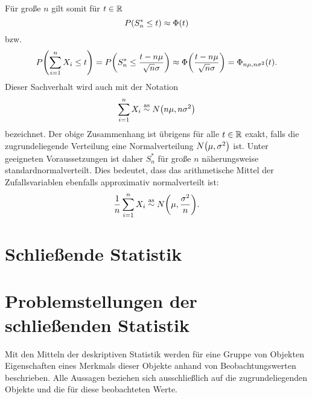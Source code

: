 \documentclass{lecture}
\begin{document}
    Für große \(n\) gilt somit für \(t \in \mathbb{R}\)
    \[
        P\parentheses*{S_n^* \le t} \approx \Phi\parentheses*{t}
    \]
    bzw.
    \[
        P\parentheses*{\sum_{i = 1}^n X_i \le t} = P\parentheses*{S_n^* \le \frac{t - n\mu}{\sqrt{n}\sigma}} \approx \Phi\parentheses*{\frac{t - n\mu}{\sqrt{n}\sigma}} = \Phi_{n\mu, n\sigma^2}\parentheses*{t}.
    \]
    Dieser Sachverhalt wird auch mit der Notation
    \[
        \sum_{i = 1}^n X_i \stackrel{\text{as}}{\sim} N\parentheses*{n\mu, n\sigma^2}
    \]
    bezeichnet.
    Der obige Zusammenhang ist übrigens für alle \(t \in \mathbb{R}\) exakt, falls die zugrundeliegende Verteilung eine Normalverteilung \(N\parentheses*{\mu, \sigma^2}\) ist.
    Unter geeigneten Voraussetzungen ist daher \(S_n^*\) für große \(n\) näherungsweise standardnormalverteilt.
    Dies bedeutet, dass das arithmetische Mittel der Zufallsvariablen ebenfalls approximativ normalverteilt ist:
    \[
        \frac{1}{n}\sum_{i = 1}^n X_i \stackrel{\text{as}}{\sim} N\parentheses*{\mu, \frac{\sigma^2}{n}}.
    \]


    \section*{Schließende Statistik}


    \section*{Problemstellungen der schließenden Statistik}

    Mit den Mitteln der deskriptiven Statistik werden für eine Gruppe von Objekten Eigenschaften eines Merkmals dieser Objekte anhand von Beobachtungswerten beschrieben.
    Alle Aussagen beziehen sich ausschließlich auf die zugrundeliegenden Objekte und die für diese beobachteten Werte.
    
\end{document}
